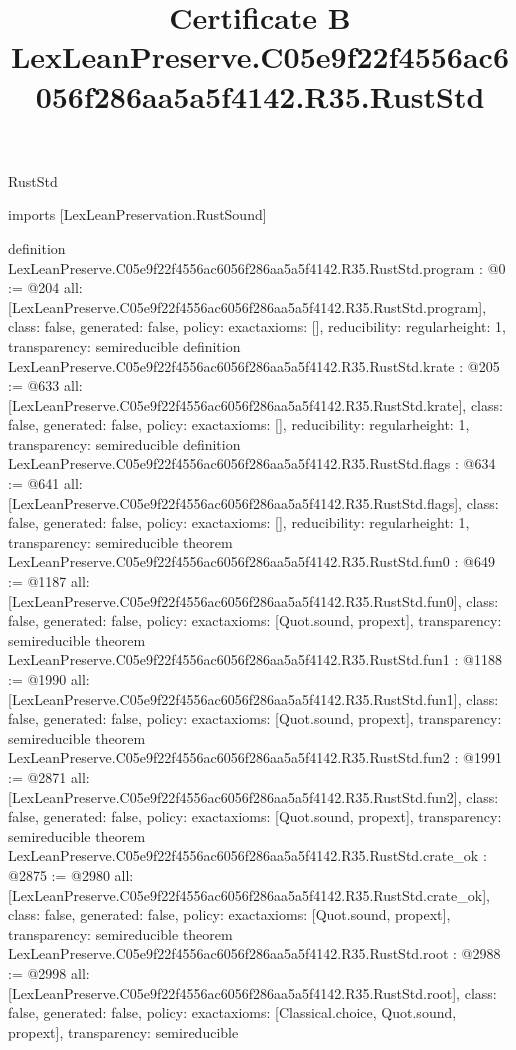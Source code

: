 \begin{lexlean}{RustStd}
\title{Certificate B LexLeanPreserve.C05e9f22f4556ac6056f286aa5a5f4142.R35.RustStd}
\begin{coremodule}
imports [LexLeanPreservation.RustSound]

definition LexLeanPreserve.C05e9f22f4556ac6056f286aa5a5f4142.R35.RustStd.program : @0 := @204 {
  all: [LexLeanPreserve.C05e9f22f4556ac6056f286aa5a5f4142.R35.RustStd.program],
  class: false,
  generated: false,
  policy: exact{axioms: []},
  reducibility: regular{height: 1},
  transparency: semireducible
}
definition LexLeanPreserve.C05e9f22f4556ac6056f286aa5a5f4142.R35.RustStd.krate : @205 := @633 {
  all: [LexLeanPreserve.C05e9f22f4556ac6056f286aa5a5f4142.R35.RustStd.krate],
  class: false,
  generated: false,
  policy: exact{axioms: []},
  reducibility: regular{height: 1},
  transparency: semireducible
}
definition LexLeanPreserve.C05e9f22f4556ac6056f286aa5a5f4142.R35.RustStd.flags : @634 := @641 {
  all: [LexLeanPreserve.C05e9f22f4556ac6056f286aa5a5f4142.R35.RustStd.flags],
  class: false,
  generated: false,
  policy: exact{axioms: []},
  reducibility: regular{height: 1},
  transparency: semireducible
}
theorem LexLeanPreserve.C05e9f22f4556ac6056f286aa5a5f4142.R35.RustStd.fun0 : @649 := @1187 {
  all: [LexLeanPreserve.C05e9f22f4556ac6056f286aa5a5f4142.R35.RustStd.fun0],
  class: false,
  generated: false,
  policy: exact{axioms: [Quot.sound, propext]},
  transparency: semireducible
}
theorem LexLeanPreserve.C05e9f22f4556ac6056f286aa5a5f4142.R35.RustStd.fun1 : @1188 := @1990 {
  all: [LexLeanPreserve.C05e9f22f4556ac6056f286aa5a5f4142.R35.RustStd.fun1],
  class: false,
  generated: false,
  policy: exact{axioms: [Quot.sound, propext]},
  transparency: semireducible
}
theorem LexLeanPreserve.C05e9f22f4556ac6056f286aa5a5f4142.R35.RustStd.fun2 : @1991 := @2871 {
  all: [LexLeanPreserve.C05e9f22f4556ac6056f286aa5a5f4142.R35.RustStd.fun2],
  class: false,
  generated: false,
  policy: exact{axioms: [Quot.sound, propext]},
  transparency: semireducible
}
theorem LexLeanPreserve.C05e9f22f4556ac6056f286aa5a5f4142.R35.RustStd.crate_ok : @2875 := @2980 {
  all: [LexLeanPreserve.C05e9f22f4556ac6056f286aa5a5f4142.R35.RustStd.crate_ok],
  class: false,
  generated: false,
  policy: exact{axioms: [Quot.sound, propext]},
  transparency: semireducible
}
theorem LexLeanPreserve.C05e9f22f4556ac6056f286aa5a5f4142.R35.RustStd.root : @2988 := @2998 {
  all: [LexLeanPreserve.C05e9f22f4556ac6056f286aa5a5f4142.R35.RustStd.root],
  class: false,
  generated: false,
  policy: exact{axioms: [Classical.choice, Quot.sound, propext]},
  transparency: semireducible
}


\end{coremodule}
\end{lexlean}
